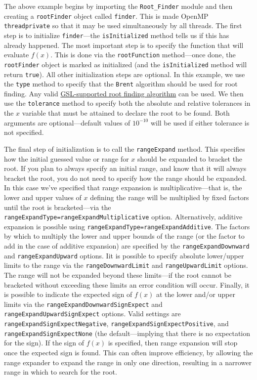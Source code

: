 The above example begins by importing the {\tt Root\_Finder} module and then creating a {\tt rootFinder} object called {\tt finder}. This is made OpenMP {\tt threadprivate} so that it may be used simultaneously by all threads. The first step is to initialize {\tt finder}---the {\tt isInitialized} method tells us if this has already happened. The most important step is to specify the function that will evaluate $f(x)$. This is done via the {\tt rootFunction} method---once done, the {\tt rootFinder} object is marked as initialized (and the {\tt isInitialized} method will return {\tt true}). All other initialization steps are optional. In this example, we use the {\tt type} method to specify that the {\tt Brent} algorithm should be used for root finding. Any valid \href{http://www.gnu.org/software/gsl/manual/html_node/Root-Bracketing-Algorithms.html}{GSL-supported root finding algorithm} can be used. We then use the {\tt tolerance} method to specify both the absolute and relative tolerances in the $x$ variable that must be attained to declare the root to be found. Both arguments are optional---default values of $10^{-10}$ will be used if either tolerance is not specified. 

The final step of initialization is to call the {\tt rangeExpand} method. This specifies how the initial guessed value or range for $x$ should be expanded to bracket the root. If you plan to always specify an initial range, and know that it will always bracket the root, you do not need to specify how the range should be expanded. In this case we've specified that range expansion is multiplicative---that is, the lower and upper values of $x$ defining the range will be multiplied by fixed factors until the root is bracketed---via the {\tt rangeExpandType=rangeExpandMultiplicative} option. Alternatively, additive expansion is possible using {\tt rangeExpandType=rangeExpandAdditive}. The factors by which to multiply the lower and upper bounds of the range (or the factor to add in the case of additive expansion) are specified by the {\tt rangeExpandDownward} and {\tt rangeExpandUpward} options. Iit is possible to specify absolute lower/upper limits to the range via the {\tt rangeDownwardLimit} and {\tt rangeUpwardLimit} options. The range will not be expanded beyond these limits---if the root cannot be bracketed without exceeding these limits an error condition will occur. Finally, it is possible to indicate the expected sign of $f(x)$ at the lower and/or upper limits via the {\tt rangeExpandDownwardSignExpect} and {\tt rangeExpandUpwardSignExpect} options. Valid settings are {\tt rangeExpandSignExpectNegative}, {\tt rangeExpandSignExpectPositive}, and {\tt rangeExpandSignExpectNone} (the default---implying that there is no expectation for the sign). If the sign of $f(x)$ is specified, then range expansion will stop once the expected sign is found. This can often improve efficiency, by allowing the range expander to expand the range in only one direction, resulting in a narrower range in which to search for the root.


